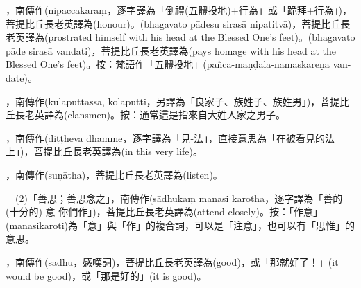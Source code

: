 \startitemgroup[noteitems]
\item{}，南傳作(nipaccakāraṃ，逐字譯為「倒禮(五體投地)+行為」或「跪拜+行為」)，菩提比丘長老英譯為(honour)。(bhagavato pādesu sirasā nipatitvā)，菩提比丘長老英譯為(prostrated himself with his head at the Blessed One's feet)。(bhagavato pāde sirasā vandati)，菩提比丘長老英譯為(pays homage with his head at the Blessed One's feet)。按：梵語作「五體投地」(pañca-maṇḍala-namaskāreṇa van-date)。
\stopitemgroup

\startitemgroup[noteitems]
\item{}，南傳作(kulaputtassa, kolaputti，另譯為「良家子、族姓子、族姓男」)，菩提比丘長老英譯為(clansmen)。按：通常這是指來自大姓人家之男子。
\stopitemgroup

\startitemgroup[noteitems]
\item{}，南傳作(diṭṭheva dhamme，逐字譯為「見-法」，直接意思為「在被看見的法上」)，菩提比丘長老英譯為(in this very life)。
\stopitemgroup

\startitemgroup[noteitems]
\item{}，南傳作(suṇātha)，菩提比丘長老英譯為(listen)。
\item{}　(2)「善思；善思念之」，南傳作(sādhukaṃ manasi karotha，逐字譯為「善的(十分的)-意-你們作」)，菩提比丘長老英譯為(attend closely)。按：「作意」(manasikaroti)為「意」與「作」的複合詞，可以是「注意」，也可以有「思惟」的意思。
\stopitemgroup

\startitemgroup[noteitems]
\item{}，南傳作(sādhu，感嘆詞)，菩提比丘長老英譯為(good)，或「那就好了！」(it would be good)，或「那是好的」(it is good)。
\stopitemgroup

